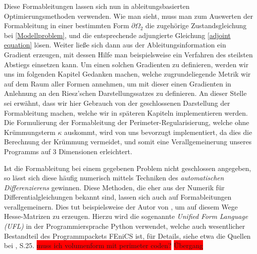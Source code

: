 Diese Formableitungen lassen sich nun in ableitungsbasierten Optimierungsmethoden verwenden. Wie man sieht, muss man zum Auswerten der Formableitung in einer bestimmten Form $\partial\Omega_2$ die zugehörige Zustandsgleichung bei \ref{Modellproblem}, und die entsprechende adjungierte Gleichung \ref{adjoint equation} lösen. Weiter ließe sich dann aus der Ableitungsinformation ein Gradient erzeugen, mit dessen Hilfe man beispielsweise ein Verfahren des steilsten Abstiegs einsetzen kann. Um einen solchen Gradienten zu definieren, werden wir uns im folgenden Kapitel Gedanken machen, welche zugrundeliegende Metrik wir auf dem Raum aller Formen annehmen, um mit dieser einen Gradienten in Anlehnung an den Riesz'schen Darstellungssatzes zu definieren. An dieser Stelle sei erwähnt, dass wir hier Gebrauch von der geschlossenen Darstellung der Formableitung machen, welche wir in späteren Kapiteln implementieren werden. Die Formulierung der Formableitung der Perimeter-Regularisierung, welche ohne Krümmungsterm $\kappa$ auskommt, wird von uns bevorzugt implementiert, da dies die Berechnung der Krümmung vermeidet, und somit eine Verallgemeinerung unseres Programms auf 3 Dimensionen erleichtert.

Ist die Formableitung bei einem gegebenen Problem nicht geschlossen angegeben, so lässt sich diese häufig numerisch mittels Techniken des \textit{automatischen Differenzierens} gewinnen. Diese Methoden, die eher aus der Numerik für Differentialgleichungen bekannt sind, lassen sich auch auf Formableitungen verallgemeinern. Dies tut beispielsweise der Autor von \cite{auto-diff}, um auf diesem Wege Hesse-Matrizen zu erzeugen. Hierzu wird die sogenannte \textit{Unified Form Language (UFL)} in der Programmiersprache Python verwendet, welche auch wesentlicher Bestandteil des Programmpackets FEniCS ist, für Details, siehe etwa die Quellen bei \cite{fenics}, S.25. 
\colorbox{red}{muss ich volumenform mit perimeter coden?}
\colorbox{red}{Übergang}
